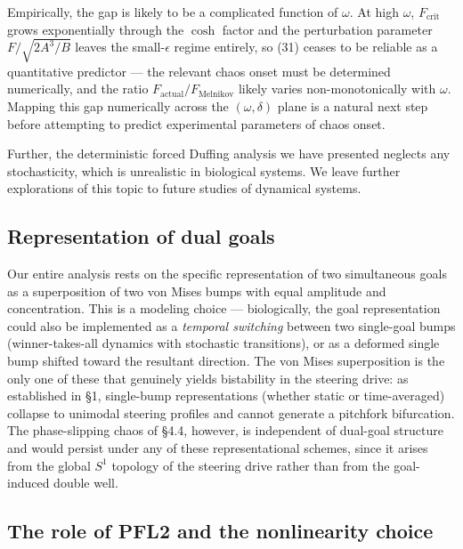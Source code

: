 \documentclass[11pt]{article}
\begin{document}
Empirically, the gap is likely to be a complicated function of $\omega$. At high $\omega$, $F_{\text{crit}}$ grows exponentially through the $\cosh$ factor and the perturbation parameter $F/\sqrt{2A^3/B}$ leaves the small-$\epsilon$ regime entirely, so (31) ceases to be reliable as a quantitative predictor --- the relevant chaos onset must be determined numerically, and the ratio $F_{\text{actual}}/F_{\text{Melnikov}}$ likely varies non-monotonically with $\omega$. Mapping this gap numerically across the $(\omega, \delta)$ plane is a natural next step before attempting to predict experimental parameters of chaos onset.

Further, the deterministic forced Duffing analysis we have presented neglects any stochasticity, which is unrealistic in biological systems. We leave further explorations of this topic to future studies of dynamical systems.

\subsection{Representation of dual goals}

Our entire analysis rests on the specific representation of two simultaneous goals as a superposition of two von Mises bumps with equal amplitude and concentration. This is a modeling choice --- biologically, the goal representation could also be implemented as a \textit{temporal switching} between two single-goal bumps (winner-takes-all dynamics with stochastic transitions), or as a deformed single bump shifted toward the resultant direction. The von Mises superposition is the only one of these that genuinely yields bistability in the steering drive: as established in §1, single-bump representations (whether static or time-averaged) collapse to unimodal steering profiles and cannot generate a pitchfork bifurcation. The phase-slipping chaos of §4.4, however, is independent of dual-goal structure and would persist under any of these representational schemes, since it arises from the global $S^1$ topology of the steering drive rather than from the goal-induced double well.

\subsection{The role of PFL2 and the nonlinearity choice}
\end{document}
